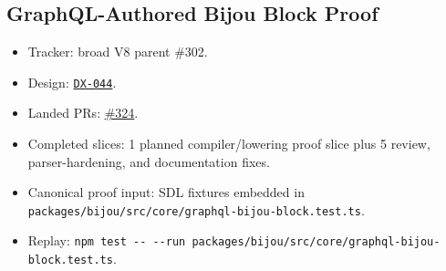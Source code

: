 \subsection{GraphQL-Authored Bijou Block Proof}\label{record-260-graphql-authored-bijou-block-proof}

\begin{itemize}
\tightlist
\item
  Tracker: broad V8 parent \#302.
\item
  Design: \href{https://github.com/flyingrobots/bijou/blob/cbd70612140e7a450d764b3c7be1c6af878b99bc/docs/design/DX-044-graphql-authored-bijou-block-ir-proof.md}{\texttt{D\allowbreak{}X\allowbreak{}-\allowbreak{}0\allowbreak{}4\allowbreak{}4}}.
\item
  Landed PRs: \href{https://github.com/flyingrobots/bijou/pull/324}{\#324}.
\item
  Completed slices: 1 planned compiler/lowering proof slice plus 5 review, parser-hardening, and documentation fixes.
\item
  Canonical proof input: SDL fixtures embedded in \texttt{p\allowbreak{}a\allowbreak{}c\allowbreak{}k\allowbreak{}a\allowbreak{}g\allowbreak{}e\allowbreak{}s\allowbreak{}/\allowbreak{}b\allowbreak{}i\allowbreak{}j\allowbreak{}o\allowbreak{}u\allowbreak{}/\allowbreak{}s\allowbreak{}r\allowbreak{}c\allowbreak{}/\allowbreak{}c\allowbreak{}o\allowbreak{}r\allowbreak{}e\allowbreak{}/\allowbreak{}g\allowbreak{}r\allowbreak{}a\allowbreak{}p\allowbreak{}h\allowbreak{}q\allowbreak{}l\allowbreak{}-\allowbreak{}b\allowbreak{}i\allowbreak{}j\allowbreak{}o\allowbreak{}u\allowbreak{}-\allowbreak{}b\allowbreak{}l\allowbreak{}o\allowbreak{}c\allowbreak{}k\allowbreak{}.\allowbreak{}t\allowbreak{}e\allowbreak{}s\allowbreak{}t\allowbreak{}.\allowbreak{}t\allowbreak{}s}.
\item
  Replay: \texttt{n\allowbreak{}p\allowbreak{}m\allowbreak{} \allowbreak{}t\allowbreak{}e\allowbreak{}s\allowbreak{}t\allowbreak{} \allowbreak{}-\allowbreak{}-\allowbreak{} \allowbreak{}-\allowbreak{}-\allowbreak{}r\allowbreak{}u\allowbreak{}n\allowbreak{} \allowbreak{}p\allowbreak{}a\allowbreak{}c\allowbreak{}k\allowbreak{}a\allowbreak{}g\allowbreak{}e\allowbreak{}s\allowbreak{}/\allowbreak{}b\allowbreak{}i\allowbreak{}j\allowbreak{}o\allowbreak{}u\allowbreak{}/\allowbreak{}s\allowbreak{}r\allowbreak{}c\allowbreak{}/\allowbreak{}c\allowbreak{}o\allowbreak{}r\allowbreak{}e\allowbreak{}/\allowbreak{}g\allowbreak{}r\allowbreak{}a\allowbreak{}p\allowbreak{}h\allowbreak{}q\allowbreak{}l\allowbreak{}-\allowbreak{}b\allowbreak{}i\allowbreak{}j\allowbreak{}o\allowbreak{}u\allowbreak{}-\allowbreak{}b\allowbreak{}l\allowbreak{}o\allowbreak{}c\allowbreak{}k\allowbreak{}.\allowbreak{}t\allowbreak{}e\allowbreak{}s\allowbreak{}t\allowbreak{}.\allowbreak{}t\allowbreak{}s}.

\end{itemize}
